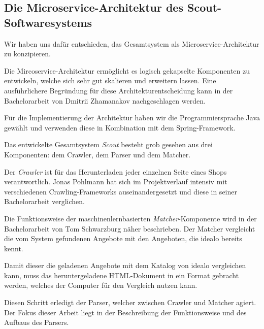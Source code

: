 \subsection{Die Microservice-Architektur des Scout-Softwaresystems}
\label{subsec:microservice-architektur}

Wir haben uns dafür entschieden, das Gesamtsystem als Microservice-Architektur zu konzipieren.

Die Mircoservice-Architektur ermöglicht es logisch gekapselte Komponenten zu entwickeln, welche sich sehr gut
skalieren und erweitern lassen.
Eine ausführlichere Begründung für diese Architekturentscheidung kann in der Bachelorarbeit von Dmitrii
Zhamanakov nachgeschlagen werden.

Für die Implementierung der Architektur haben wir die Programmiersprache Java gewählt und verwenden diese in
Kombination mit dem Spring-Framework\footnotemark.

Das entwickelte Gesamtsystem \textit{Scout} besteht grob gesehen aus drei Komponenten: dem Crawler, dem Parser und dem
Matcher.

Der \textit{Crawler} ist für das Herunterladen jeder einzelnen Seite eines Shops verantwortlich.
Jonas Pohlmann hat sich im Projektverlauf intensiv mit verschiedenen Crawling-Frameworks auseinandergesetzt und diese
in seiner Bachelorarbeit verglichen.

Die Funktionsweise der maschinenlernbasierten \textit{Matcher}-Komponente wird in der Bachelorarbeit von Tom
Schwarzburg näher beschrieben.
Der Matcher vergleicht die vom System gefundenen Angebote mit den Angeboten, die idealo bereits kennt.

Damit dieser die geladenen Angebote mit dem Katalog von idealo vergleichen kann, muss das heruntergeladene
HTML-Dokument in ein Format gebracht werden, welches der Computer für den Vergleich nutzen kann.

Diesen Schritt erledigt der Parser, welcher zwischen Crawler und Matcher agiert.
Der Fokus dieser Arbeit liegt in der Beschreibung der Funktionsweise und des Aufbaus des Parsers.